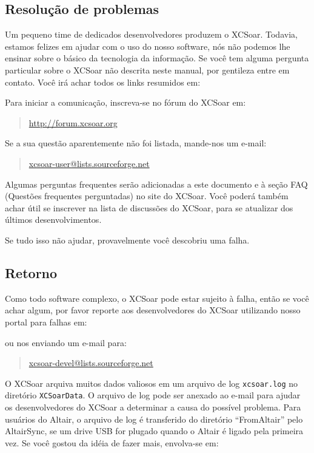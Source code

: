 \subsection*{Resolução de problemas}
Um pequeno time de dedicados desenvolvedores produzem o XCSoar.  Todavia, estamos felizes em ajudar com o uso do nosso software, nós não podemos lhe ensinar sobre o básico da tecnologia da informação.  Se você tem alguma pergunta particular sobre o XCSoar não descrita neste manual, por gentileza entre em contato.  Você irá achar todos os links resumidos em:
\begin{quote}
\end{quote}
Para iniciar a comunicação, inscreva-se no fórum do XCSoar em:
\begin{quote}
\url{http://forum.xcsoar.org}
\end{quote}
Se a sua questão aparentemente não foi listada, mande-nos um e-mail:
\begin{quote}
\href{mailto:xcsoar-user@lists.sourceforge.net}{xcsoar-user@lists.sourceforge.net}
\end{quote}
Algumas perguntas frequentes serão adicionadas a este documento e à seção FAQ (Questões frequentes perguntadas) no site do XCSoar.  Você poderá também achar útil se inscrever na lista de discussões do XCSoar, para se atualizar dos últimos desenvolvimentos.

Se tudo isso não ajudar, provavelmente você descobriu uma falha.



\subsection*{Retorno}
Como todo software complexo, o XCSoar pode estar sujeito à falha, então se você achar algum, por favor reporte aos desenvolvedores do XCSoar utilizando nosso portal para falhas em:
\begin{quote}
\end{quote}
ou nos enviando um e-mail para: 
\begin{quote}
\href{mailto:xcsoar-devel@lists.sourceforge.net}{xcsoar-devel@lists.sourceforge.net}
\end{quote}
O XCSoar arquiva muitos dados valiosos em um arquivo de log 
\verb|xcsoar.log| no diretório \texttt{XCSoarData}. O arquivo de log pode ser anexado ao e-mail para ajudar os desenvolvedores do XCSoar a determinar a causa do possível problema.  Para usuários do Altair, o arquivo de log é transferido do diretório “FromAltair” pelo AltairSync, se um drive USB for plugado quando o Altair é ligado pela primeira vez.  Se você gostou da idéia de fazer mais, envolva-se em:
\begin{quote}
\end{quote}

